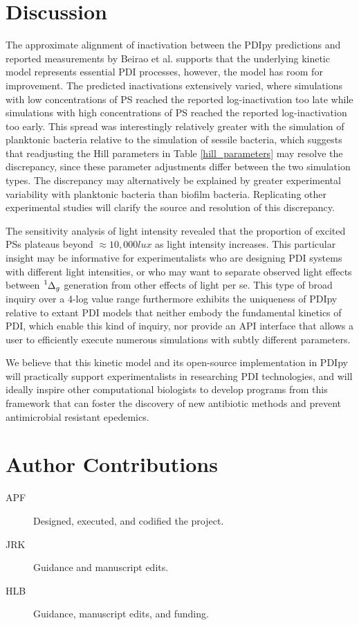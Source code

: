 \section{Discussion}
The approximate alignment of inactivation between the PDIpy predictions and reported measurements by Beirao et al. supports that the underlying kinetic model represents essential PDI processes, however, the model has room for improvement. The predicted inactivations extensively varied, where simulations with low concentrations of PS reached the reported log-inactivation too late while simulations with high concentrations of PS reached the reported log-inactivation too early. This spread was interestingly relatively greater with the simulation of planktonic bacteria relative to the simulation of sessile bacteria, which suggests that readjusting the Hill parameters in Table \ref{hill_parameters} may resolve the discrepancy, since these parameter adjustments differ between the two simulation types. The discrepancy may alternatively be explained by greater experimental variability with planktonic bacteria than biofilm bacteria. Replicating other experimental studies will clarify the source and resolution of this discrepancy. 

The sensitivity analysis of light intensity revealed that the proportion of excited PSs plateaus beyond $\approx 10,000 lux$ as light intensity increases. This particular insight may be informative for experimentalists who are designing PDI systems with different light intensities, or who may want to separate observed light effects between $\ce{^1\Delta_g}$ generation from other effects of light per se. This type of broad inquiry over a 4-log value range furthermore exhibits the uniqueness of PDIpy relative to extant PDI models that neither embody the fundamental kinetics of PDI, which enable this kind of inquiry, nor provide an API interface that allows a user to efficiently execute numerous simulations with subtly different parameters.  

We believe that this kinetic model and its open-source implementation in PDIpy will practically support experimentalists in researching PDI technologies, and will ideally inspire other computational biologists to develop programs from this framework that can foster the discovery of new antibiotic methods and prevent antimicrobial resistant epedemics.

\section{Author Contributions}
\begin{description}
    \item[APF] Designed, executed, and codified the project.
    \item[JRK] Guidance and manuscript edits.
    \item[HLB] Guidance, manuscript edits, and funding.
\end{description}


